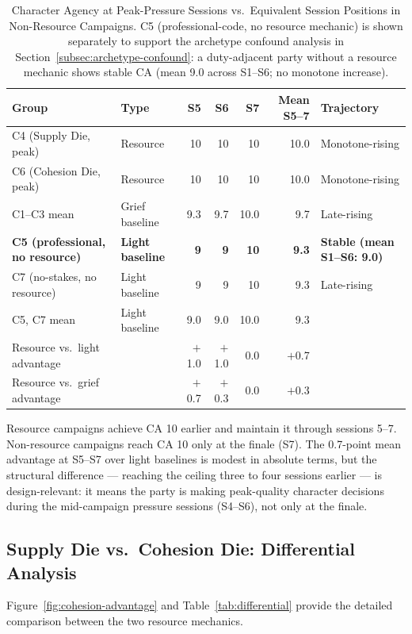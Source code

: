 \begin{table}[t]
\caption{Character Agency at Peak-Pressure Sessions vs.\ Equivalent Session Positions
  in Non-Resource Campaigns. C5 (professional-code, no resource mechanic) is shown
  separately to support the archetype confound analysis in Section~\ref{subsec:archetype-confound}:
  a duty-adjacent party without a resource mechanic shows stable CA (mean 9.0 across
  S1--S6; no monotone increase).}
\label{tab:peak-pressure}
\begin{tabular}{@{}llrrrrl@{}}
\toprule
Group & Type & S5 & S6 & S7 & Mean S5--7 & Trajectory \\
\midrule
C4 (Supply Die, peak) & Resource & 10 & 10 & 10 & 10.0 & Monotone-rising \\
C6 (Cohesion Die, peak) & Resource & 10 & 10 & 10 & 10.0 & Monotone-rising \\
C1--C3 mean & Grief baseline & 9.3 & 9.7 & 10.0 & 9.7 & Late-rising \\
\textbf{C5 (professional, no resource)} & \textbf{Light baseline} & \textbf{9} & \textbf{9} & \textbf{10} & \textbf{9.3} & \textbf{Stable (mean S1--S6: 9.0)} \\
C7 (no-stakes, no resource) & Light baseline & 9 & 9 & 10 & 9.3 & Late-rising \\
C5, C7 mean & Light baseline & 9.0 & 9.0 & 10.0 & 9.3 & \\
\midrule
Resource vs.\ light advantage & & $+$1.0 & $+$1.0 & 0.0 & $+$0.7 & \\
Resource vs.\ grief advantage & & $+$0.7 & $+$0.3 & 0.0 & $+$0.3 & \\
\bottomrule
\end{tabular}
\end{table}

Resource campaigns achieve CA 10 earlier and maintain it through sessions 5--7.
Non-resource campaigns reach CA 10 only at the finale (S7). The 0.7-point mean
advantage at S5--S7 over light baselines is modest in absolute terms, but the
structural difference --- reaching the ceiling three to four sessions earlier ---
is design-relevant: it means the party is making peak-quality character decisions
during the mid-campaign pressure sessions (S4--S6), not only at the finale.

\subsection{Supply Die vs.\ Cohesion Die: Differential Analysis}

Figure~\ref{fig:cohesion-advantage} and Table~\ref{tab:differential} provide the
detailed comparison between the two resource mechanics.

